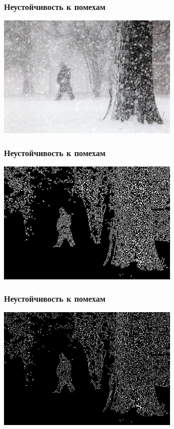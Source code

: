 \begin{frame}\frametitle{Неустойчивость к помехам}
    \begin{center}
        \includegraphics[height=6cm]{veselov_imgs/image2.jpg}
    \end{center}
\end{frame}

\begin{frame}\frametitle{Неустойчивость к помехам}
    \begin{center}
        \includegraphics[height=6cm]{veselov_imgs/edge_map2.jpg}
    \end{center}
\end{frame}

\begin{frame}\frametitle{Неустойчивость к помехам}
    \begin{center}
        \includegraphics[height=6cm]{veselov_imgs/l_edge_map2.jpg}
    \end{center}
\end{frame}

